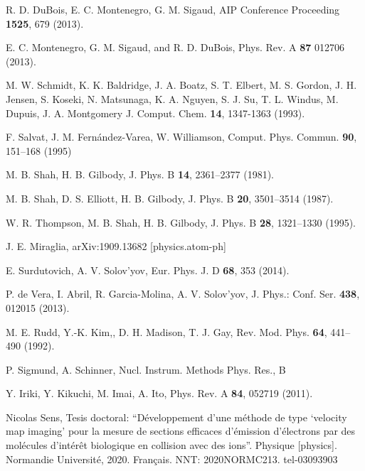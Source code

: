 \begin{thebibliography}{9}
R. D. DuBois, E. C. Montenegro, G. M. Sigaud,
AIP Conference Proceeding \textbf{1525}, 679 (2013).

E. C. Montenegro, G. M. Sigaud, and R. D. DuBois, 
Phys. Rev. A \textbf{87} 012706 (2013).

M. W. Schmidt, K. K. Baldridge, J. A. Boatz, S. T. Elbert, M. S. Gordon, 
J. H. Jensen, S. Koseki, N. Matsunaga, K. A. Nguyen, S. J. Su, T. L. Windus, 
M. Dupuis, J. A. Montgomery 
J. Comput. Chem. \textbf{14}, 1347-1363 (1993).

F. Salvat, J. M. Fern\'andez-Varea, W. Williamson,
Comput. Phys. Commun. \textbf{90}, 151--168 (1995)

M. B. Shah, H. B. Gilbody,
J. Phys. B \textbf{14}, 2361--2377 (1981).

M. B. Shah, D. S. Elliott, H. B. Gilbody,
J. Phys. B \textbf{20}, 3501--3514 (1987).

W. R. Thompson, M. B. Shah, H. B. Gilbody,
J. Phys. B \textbf{28}, 1321--1330 (1995).

J. E. Miraglia,
arXiv:1909.13682 [physics.atom-ph]

E. Surdutovich, A. V. Solov'yov, 
Eur. Phys. J. D \textbf{68}, 353 (2014).

P. de Vera, I. Abril, R. Garcia-Molina, A. V. Solov'yov,
J. Phys.: Conf. Ser. \textbf{438}, 012015 (2013).

M. E. Rudd, Y.-K. Kim,, D. H. Madison, T. J. Gay,
Rev. Mod. Phys. \textbf{64}, 441--490 (1992).

P. Sigmund, A. Schinner,
Nucl. Instrum. Methods Phys. Res., B \textbf{}

Y. Iriki, Y. Kikuchi, M. Imai, A. Ito,
Phys. Rev. A \textbf{84}, 052719 (2011).

Nicolas Sens, Tesis doctoral:
``Développement d’une méthode de type `velocity map imaging' pour la 
mesure de sections efficaces d’émission d’électrons par des molécules 
d’intérêt biologique en collision avec des ions''. 
Physique [physics]. Normandie Université, 2020. Français. 
NNT: 2020NORMC213. tel-03093903


\end{thebibliography}
